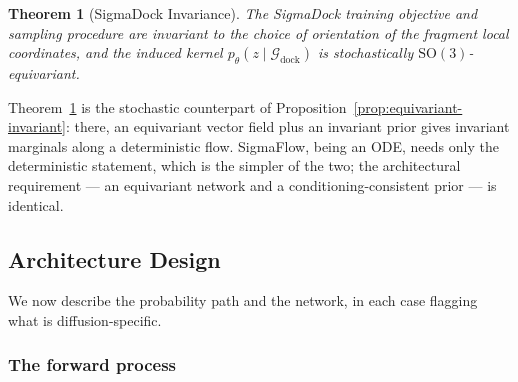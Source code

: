 \documentclass[a4paper,12pt]{article}
\newtheorem{theorem}{Theorem}[section]
\theoremstyle{remark}
\begin{document}
\begin{theorem}[SigmaDock Invariance]
\label{thm:sigmadock-symmetry}
The SigmaDock training objective and sampling procedure are invariant to the choice of orientation
of the fragment local coordinates, and the induced kernel $p_\theta(z \mid \mathcal{G}_{\text{dock}})$
is stochastically $\mathrm{SO}(3)$-equivariant.
\end{theorem}

Theorem~\ref{thm:sigmadock-symmetry} is the stochastic counterpart of
Proposition~\ref{prop:equivariant-invariant}: there, an equivariant vector field plus an invariant
prior gives invariant marginals along a deterministic flow. SigmaFlow, being an ODE, needs only the
deterministic statement, which is the simpler of the two; the architectural requirement --- an
equivariant network and a conditioning-consistent prior --- is identical.




\subsection{Architecture Design}
\label{sec:architecture-design}

We now describe the probability path and the network, in each case flagging what is
diffusion-specific.

\subsubsection{The forward process}
\label{sec:sigmadock-forward}
\end{document}
